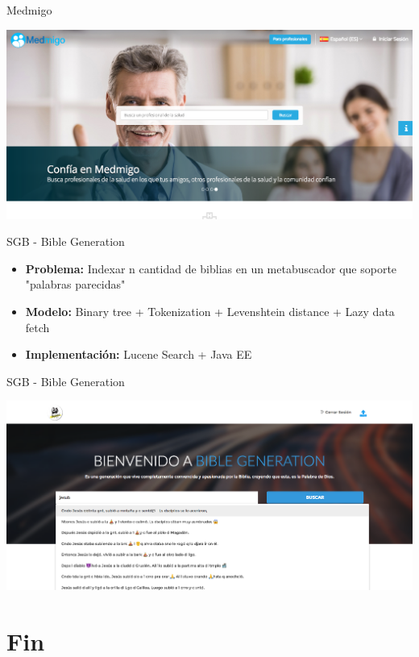 \documentclass{beamer}
\begin{document}
\begin{frame}{Medmigo}
    \begin{center}
        \includegraphics[width=0.9\linewidth]{Images/Medmigo}
    \end{center}
\end{frame}

\begin{frame}{SGB - Bible Generation}
    \begin{itemize}
        \item \textbf{Problema:} Indexar n cantidad de biblias en un metabuscador que soporte "palabras parecidas"
        \item \textbf{Modelo: } Binary tree + Tokenization + Levenshtein distance + Lazy data fetch
         \item \textbf{Implementación: } Lucene Search + Java EE 
    \end{itemize}
\end{frame}

\begin{frame}{SGB - Bible Generation}
    \begin{center}
        \includegraphics[width=0.9\linewidth]{Images/bible}
    \end{center}
\end{frame}


\section{Fin}
\end{document}
